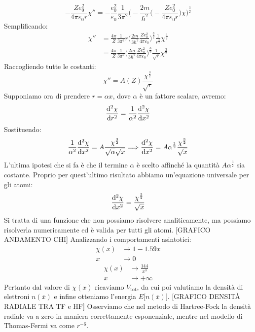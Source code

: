 \begin{equation*}
    -\frac{Ze_0^2}{4\pi\varepsilon_0r}\chi''=-\frac{e_0^2}{\varepsilon_0}\frac{1}{3\pi^2}\bigg(-\frac{2m}{\hbar^2}\bigg(-\frac{Ze_0^2}{4\pi\varepsilon_0r}\bigg)\chi\bigg)^{\frac32}
\end{equation*}
Semplificando:
\begin{equation*}
    \begin{aligned}
    \chi''& =\frac{4\pi}{Z}\frac{1}{3\pi^2}r\bigg(\frac{2m}{3\hbar^2}\frac{Ze_0^2}{4\pi\varepsilon_0}\bigg)^{\frac32}\frac{1}{r^{\frac32}}\chi^{\frac32}\\
    & = \frac{4\pi}{Z}\frac{1}{3\pi^2}\bigg(\frac{2m}{3\hbar^2}\frac{Ze_0^2}{4\pi\varepsilon_0}\bigg)^{\frac32}\frac{1}{\sqrt r}\chi^{\frac32}
    \end{aligned}
\end{equation*}
Raccogliendo tutte le costanti:
\begin{equation*}
    \chi''=A(Z)\frac{\chi^{\frac32}}{\sqrt r}
\end{equation*}
Supponiamo ora di prendere $r=\alpha x$, dove $\alpha$ è un fattore scalare, avremo:
\begin{equation*}
    \dv[2]{\chi}{r}=\frac{1}{\alpha^2}\dv[2]{\chi}{x}
\end{equation*}
Sostituendo:
\begin{equation*}
    \frac{1}{\alpha^2}\dv[2]{\chi}{x}=A\frac{\chi^{\frac32}}{\sqrt \alpha \sqrt x}\Longrightarrow\dv[2]{\chi}{x}=A\alpha^{\frac 32}\frac{\chi^{\frac32}}{\sqrt x}
\end{equation*}
L'ultima ipotesi che si fa è che il termine $\alpha$ è scelto affinché la quantità $A\alpha^{\frac 32}$ sia costante. Proprio per quest'ultimo risultato abbiamo un'equazione universale per gli atomi:
\begin{equation*}
    \dv[2]{\chi}{x}=\frac{\chi^{\frac 32}}{\sqrt x}
\end{equation*}
Si tratta di una funzione che non possiamo risolvere analiticamente, ma possiamo risolverla numericamente ed è valida per tutti gli atomi.
[GRAFICO ANDAMENTO CHI]
Analizzando i comportamenti asintotici:
\begin{equation*}
    \begin{aligned}
        \chi(x) &\rightarrow  1-1.59x\\
        x &\rightarrow 0
    \end{aligned}
\end{equation*}
\begin{equation*}
    \begin{aligned}
        \chi(x) &\rightarrow  \frac{144}{x^3}\\
        x &\rightarrow +\infty
    \end{aligned}
\end{equation*}
Pertanto dal valore di $\chi(x)$ ricaviamo $V_{\text{tot}}$, da cui poi valutiamo la densità di elettroni $n(\overline x)$ e infine otteniamo l'energia $E\big[n(\overline x)\big]$.
[GRAFICO DENSITÀ RADIALE TRA TF e HF]
Osserviamo che nel metodo di Hartree-Fock la densità radiale va a zero in maniera correttamente esponenziale, mentre nel modello di Thomas-Fermi va come $r^{-6}$.

